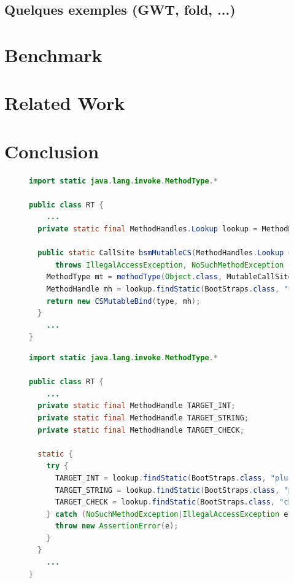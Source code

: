 \documentclass{sigplanconf}
\begin{document}
  \subsection{Quelques exemples (GWT, fold, ...)}

\section{Benchmark}  

\section{Related Work}

\section{Conclusion}

\begin{figure}
  \begin{lstlisting}[language=Java]
import static java.lang.invoke.MethodType.*

public class RT {
    ...
  private static final MethodHandles.Lookup lookup = MethodHandles.lookup();

  public static CallSite bsmMutableCS(MethodHandles.Lookup caller, String name, MethodType type)
      throws IllegalAccessException, NoSuchMethodException {
    MethodType mt = methodType(Object.class, MutableCallSite.class, Object[].class);
    MethodHandle mh = lookup.findStatic(BootStraps.class, "change", mt);
    return new CSMutableBind(type, mh);
  }
    ...
}
  \end{lstlisting}
  \caption{}
\end{figure}

\begin{figure}
  \begin{lstlisting}[language=Java]
import static java.lang.invoke.MethodType.*

public class RT {
    ...
  private static final MethodHandle TARGET_INT;
  private static final MethodHandle TARGET_STRING;
  private static final MethodHandle TARGET_CHECK;

  static {
    try {
      TARGET_INT = lookup.findStatic(BootStraps.class, "plus", methodType(Object.class, int.class, int.class));
      TARGET_STRING = lookup.findStatic(BootStraps.class, "plus", methodType(Object.class, String.class, int.class));
      TARGET_CHECK = lookup.findStatic(BootStraps.class, "check", methodType(boolean.class, Object.class, Class.class));
    } catch (NoSuchMethodException|IllegalAccessException e) {
      throw new AssertionError(e);
    }
  }
    ...
}
  \end{lstlisting}
  \caption{}
\end{figure}
\end{document}
